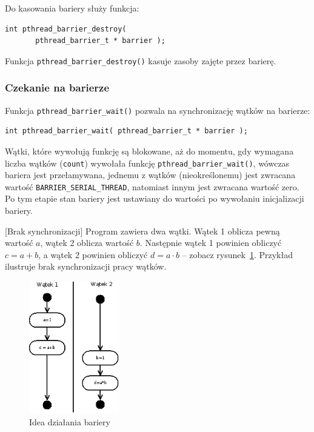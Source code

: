 Do kasowania bariery służy funkcja:

\begin{lstlisting}[style=MyCStyle]
int pthread_barrier_destroy(
       pthread_barrier_t * barrier );
\end{lstlisting}

Funkcja \lstinline[style=MyCStyle]{pthread_barrier_destroy()} kasuje zasoby zajęte przez barierę. 

\subsubsection{Czekanie na barierze}

Funkcja  \lstinline[style=MyCStyle]{pthread_barrier_wait()} pozwala na synchronizację wątków na barierze: 

\begin{lstlisting}[style=MyCStyle]
	int pthread_barrier_wait( pthread_barrier_t * barrier );
\end{lstlisting}

Wątki, które wywołują funkcję są blokowane, aż do momentu, gdy wymagana liczba wątków (\lstinline[style=MyCStyle]{count}) wywołała funkcję \lstinline[style=MyCStyle]{pthread_barrier_wait()}, wówczas bariera jest przełamywana, jednemu z wątków (nieokreślonemu) jest zwracana wartość \lstinline[style=MyCStyle]{BARRIER_SERIAL_THREAD}, natomiast innym jest zwracana wartość zero. Po tym etapie stan bariery jest ustawiany do wartości po wywołaniu inicjalizacji bariery. 

\begin{example}{[Brak synchronizacji]}
Program zawiera dwa wątki. Wątek 1 oblicza pewną wartość $a$, wątek 2 oblicza wartość $b$. Następnie wątek 1 powinien obliczyć $c=a+b$, a wątek 2 powinien obliczyć $d=a\cdot b$ -- zobacz rysunek~\ref{fig:thrd_async_example}. Przykład ilustruje brak synchronizacji pracy wątków.

\begin{figure}[!h]
\centering
\includegraphics[width=0.35\textwidth]{img/thrd_async_example}
\caption{Idea działania bariery}
\label{fig:thrd_async_example}
\end{figure}


\end{example}

